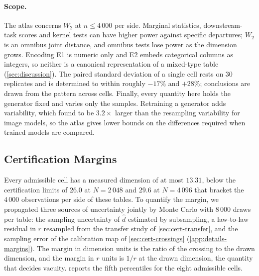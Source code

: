 \documentclass[twoside,11pt]{article}
\theoremstyle{plain}
\theoremstyle{definition}
\theoremstyle{remark}
\newcommand{\Wtwo}{\ensuremath{W_2}}
\newcommand{\dhat}{\ensuremath{\hat{d}}}
\begin{document}
\paragraph{Scope.} The atlas concerns $\Wtwo$ at $n \leq 4\,000$ per side.
Marginal statistics, downstream-task scores and kernel tests can have
higher power against specific departures; $\Wtwo$ is an omnibus joint
distance, and omnibus tests lose power as the dimension grows. Encoding E1
is numeric only and E2 embeds categorical columns as integers, so neither is
a canonical representation of a mixed-type table (\cref{sec:discussion}).
The paired standard deviation of a single cell rests on $30$ replicates and
is determined to within roughly $-17\%$ and $+28\%$; conclusions are drawn
from the pattern across cells. Finally, every quantity here holds the
generator fixed and varies only the samples. Retraining a generator adds
variability, which \citet{dufour2026} found to be $3.2\times$ larger than
the resampling variability for image models, so the atlas gives lower
bounds on the differences required when trained models are compared.

\subsection{Certification Margins}\label{sec:empirical-margins}

Every admissible cell has a measured dimension of at most $13.31$, below
the certification limits of $26.0$ at $N = 2\,048$ and $29.6$ at
$N = 4\,096$ that bracket the $4\,000$ observations per side of these tables.
To quantify the margin, we propagated three sources of uncertainty jointly
by Monte Carlo with $8\,000$ draws per table: the sampling uncertainty of
$\dhat$ estimated by subsampling, a law-to-law residual in $r$ resampled from
the transfer study of \cref{sec:cert-transfer}, and the sampling error of the
calibration map of \cref{sec:cert-crossings} (\cref{app:details-margins}).
The margin in dimension units is the ratio of the crossing to the drawn
dimension, and the margin in $r$ units is $1/r$ at the drawn dimension, the
quantity that decides vacuity.  reports the fifth
percentiles for the eight admissible cells.
\end{document}
